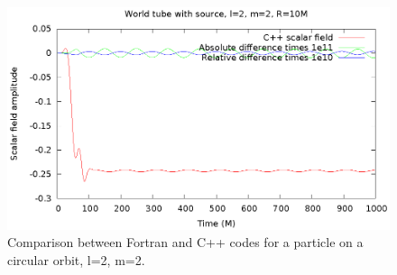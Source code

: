 \begin{figure}
  \includegraphics{wtcircl2m2}
  \caption{Comparison between Fortran and C++ codes for a particle on a circular orbit, l=2, m=2.}
\end{figure}
